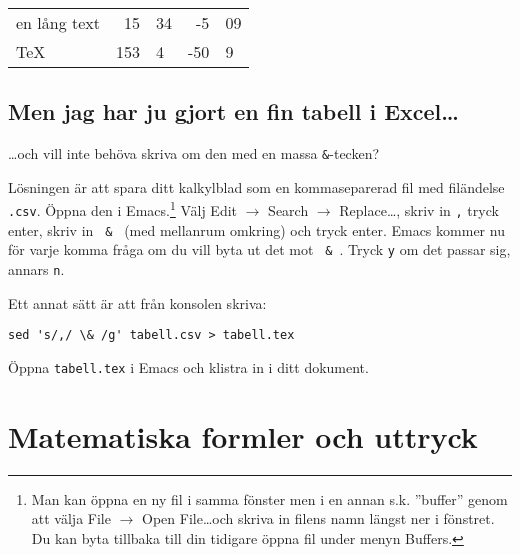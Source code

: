 \documentclass[11pt,a4paper]{article}
\begin{document}
\begin{tabular}{l @{} r @{.} l | r @{.} l}
\hline
en lång text & 15 & 34 & -5 & 09 \\
\TeX & 153 & 4 & -50 & 9 \\
\hline
\end{tabular}


\subsection{Men jag har ju gjort en fin tabell i Excel\dots}

\dots och vill inte behöva skriva om den med en massa \texttt{\&}-tecken?

Lösningen är att spara ditt kalkylblad som en kommaseparerad fil med filändelse \texttt{.csv}. Öppna den i Emacs.\footnote{Man kan öppna en ny fil i samma fönster men i en annan s.k. ''buffer'' genom att välja File $\to$ Open File\dots och skriva in filens namn längst ner i fönstret. Du kan byta tillbaka till din tidigare öppna fil under menyn Buffers.}
Välj Edit $\to$ Search $\to$ Replace\dots, skriv in \texttt{,} tryck enter, skriv in \texttt{\ \&\ } (med mellanrum omkring) och tryck enter. Emacs kommer nu för varje komma fråga om du vill byta ut det mot \texttt{\ \&\ }. Tryck \texttt{y} om det passar sig, annars \texttt{n}.

Ett annat sätt är att från konsolen skriva:
\begin{verbatim}
sed 's/,/ \& /g' tabell.csv > tabell.tex
\end{verbatim}
Öppna \texttt{tabell.tex} i Emacs och klistra in i ditt dokument.



\section{Matematiska formler och uttryck}
\end{document}

